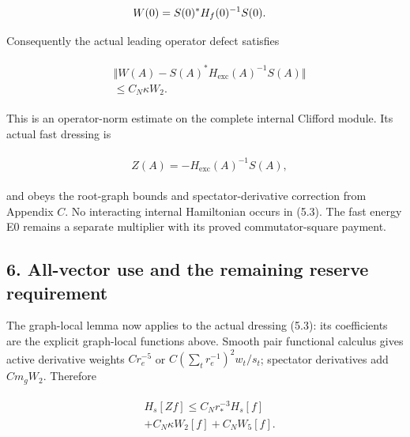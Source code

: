\begin{gather*}
\begin{aligned}
& W(0)=S(0)^{*}H_{f}(0)^{-1} S(0).
\end{aligned}\notag
\end{gather*}

Consequently the actual leading operator defect satisfies

\begin{gather*}
\begin{aligned}
& \Vert W(A)-S(A)^{*}H_{\mathrm{exc}}(A)^{-1} S(A)\Vert \\
& \le  C_{N} \kappa  W_{2}.
\end{aligned}\tag{5.2}
\end{gather*}

This is an operator-norm estimate on the complete internal Clifford
module. Its actual fast dressing is

\begin{gather*}
\begin{aligned}
& Z(A)=-H_{\mathrm{exc}}(A)^{-1} S(A),
\end{aligned}\tag{5.3}
\end{gather*}

and obeys the root-graph bounds and spectator-derivative correction from
Appendix \(C\). No interacting internal Hamiltonian occurs in (5.3). The
fast energy E0 remains a separate multiplier with its proved
commutator-square payment.

\subsection{6. All-vector use and the remaining reserve
requirement}\label{d-all-vector-use-and-the-remaining-reserve-requirement}

The graph-local lemma now applies to the actual dressing (5.3): its
coefficients are the explicit graph-local functions above. Smooth pair
functional calculus gives active derivative weights \(C r_{e}^{-5}\) or
\(C(\sum _{t} r_{e}^{-1})^{2}w_{t}/s_{t}\); spectator derivatives add
\(C m_{g} W_{2}\). Therefore

\begin{gather*}
\begin{aligned}
& H_{s}[Zf] \le  C_{N} r_{*}^{-3} H_{s}[f] \\
& +C_{N} \kappa  W_{2}[f]+C_{N} W_{5}[f].
\end{aligned}\tag{6.1}
\end{gather*}

